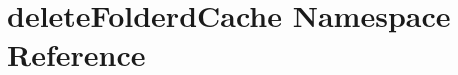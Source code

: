 \hypertarget{namespacedeleteFolderdCache}{
\section{deleteFolderdCache Namespace Reference}
\label{namespacedeleteFolderdCache}
}
